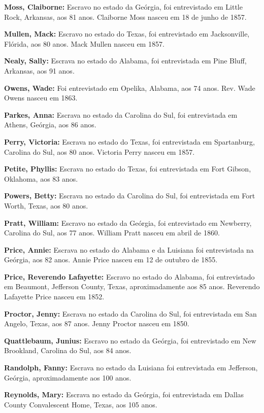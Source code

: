 \textbf{Moss, Claiborne:} Escravo no estado da Geórgia, foi entrevistado
em Little Rock, Arkansas, aos 81 anos. Claiborne Moss nasceu em 18 de
junho de 1857.

\textbf{Mullen, Mack:} Escravo no estado do Texas, foi entrevistado em
Jacksonville, Flórida, aos 80 anos. Mack Mullen nasceu em 1857.

\textbf{Nealy, Sally:} Escrava no estado do Alabama, foi entrevistada em
Pine Bluff, Arkansas, aos 91 anos.

\textbf{Owens, Wade:} Foi entrevistado em Opelika, Alabama, aos 74 anos.
Rev. Wade Owens nasceu em 1863.

\textbf{Parkes, Anna:} Escrava no estado da Carolina do Sul, foi
entrevistada em Athens, Geórgia, aos 86 anos.

\textbf{Perry, Victoria:} Escrava no estado do Texas, foi entrevistada
em Spartanburg, Carolina do Sul, aos 80 anos. Victoria Perry nasceu em
1857.

\textbf{Petite, Phyllis:} Escrava no estado do Texas, foi entrevistada
em Fort Gibson, Oklahoma, aos 83 anos.

\textbf{Powers, Betty:} Escrava no estado da Carolina do Sul, foi
entrevistada em Fort Worth, Texas, aos 80 anos.

\textbf{Pratt, William:} Escravo no estado da Geórgia, foi entrevistado
em Newberry, Carolina do Sul, aos 77 anos. William Pratt nasceu em abril
de 1860.

\textbf{Price, Annie:} Escrava no estado do Alabama e da Luisiana foi
entrevistada na Geórgia, aos 82 anos. Annie Price nasceu em 12 de
outubro de 1855.

\textbf{Price, Reverendo Lafayette:} Escravo no estado do Alabama, foi
entrevistado em Beaumont, Jefferson County, Texas, aproximadamente aos
85 anos. Reverendo Lafayette Price nasceu em 1852.

\textbf{Proctor, Jenny:} Escrava no estado da Carolina do Sul, foi
entrevistada em San Angelo, Texas, aos 87 anos. Jenny Proctor nasceu em
1850.

\textbf{Quattlebaum, Junius:} Escravo no estado da Geórgia, foi
entrevistado em New Brookland, Carolina do Sul, aos 84 anos.

\textbf{Randolph, Fanny:} Escrava no estado da Luisiana foi entrevistada
em Jefferson, Geórgia, aproximadamente aos 100 anos.

\textbf{Reynolds, Mary:} Escrava no estado da Geórgia, foi entrevistada
em Dallas County Convalescent Home, Texas, aos 105 anos.

